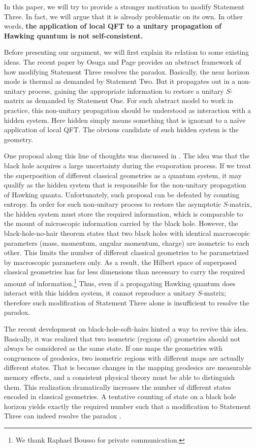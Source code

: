 \documentclass[aps,showpacs,twocolumn,floats,prd,superscriptaddress,nofootinbib]{revtex4-1}
\begin{document}
In this paper, we will try to provide a stronger motivation to modify Statement Three. 
In fact, we will argue that it is already problematic on its own. 
In other words, {\bf the application of local QFT to a unitary propagation of Hawking quantum is not self-consistent. } 

Before presenting our argument, we will first explain its relation to some existing ideas.
The recent paper by Osuga and Page \cite{OsuPag16} provides an abstract framework of how modifying Statement Three resolves the paradox.
Basically, the near horizon mode is thermal as demanded by Statement Two.
But it propagates out in a non-unitary process, gaining the appropriate information to restore a unitary $S$-matrix as demanded by Statement One. 
For such abstract model to work in practice, this non-unitary propagation should be understood as interaction with a hidden system.
Here hidden simply means something that is ignorant to a na\"ive application of local QFT.
The obvious candidate of such hidden system is the geometry.

One proposal along this line of thoughts was discussed in \cite{NomVar12}. 
The idea was that the black hole acquires a large uncertainty during the evaporation process. 
If we treat the superposition of different classical geometries as a quantum system, it may qualify as the hidden system that is responsible for the non-unitary propagation of Hawking quanta. 
Unfortunately, such proposal can be defeated by counting entropy.
In order for such non-unitary process to restore the asymptotic $S$-matrix, the hidden system must store the required information, which is comparable to the mount of microscopic information carried by the black hole.
However, the black-hole-no-hair theorem states that two black holes with identical macroscopic parameters (mass, momentum, angular momentum, charge) are isometric to each other. 
This limits the number of different classical geometries to be parametrized by macroscopic parameters only.
As a result, the Hilbert space of superposed classical geometries has far less dimensions than necessary to carry the required amount of information.\footnote{We thank Raphael Bousso for private communication.}
Thus, even if a propagating Hawking quantum does interact with this hidden system, it cannot reproduce a unitary $S$-matrix; therefore such modification of Statement Three alone is insufficient to resolve the paradox.

The recent development on black-hole-soft-hairs \cite{HawPer16} hinted a way to revive this idea.
Basically, it was realized that two isometric (regions of) geometries should not always be considered as the same state.
If one maps the geometries with congruences of geodesics, two isometric regions with different maps are actually different states.
That is because changes in the mapping geodesics are measurable memory effects, and a consistent physical theory must be able to distinguish them.
This realization dramatically increases the number of different states encoded in classical geometries.
A tentative counting of state on a black hole horizon yields exactly the required number such that a modification to Statement Three can indeed resolve the paradox \cite{HawPer16}.
\end{document}

